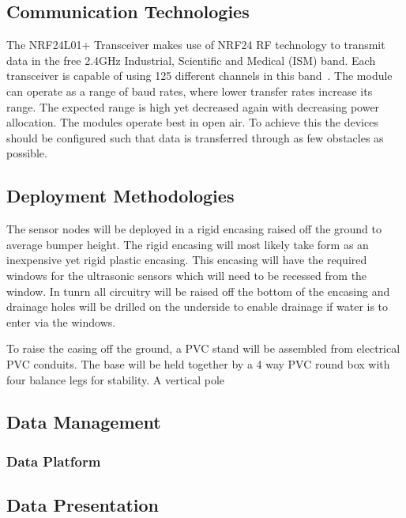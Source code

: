 \documentclass[10pt,twocolumn]{witseiepaper}
\begin{document}
	\subsection{Communication Technologies}
		The NRF24L01+ Transceiver makes use of NRF24 RF technology to transmit data in the free 2.4GHz Industrial,
		Scientific and Medical (ISM) band.  Each transceiver is capable of using 125 different channels in this band~\cite{howToMech_NRF24L01Tutorial}. The module can operate as a range of baud rates, where lower transfer rates increase its range. The expected range is high yet decreased again with decreasing power allocation. The modules operate best in open air. To achieve this the devices should be configured such that data is transferred through as few obstacles as possible. 
		
	
	\subsection{Deployment Methodologies}
		The sensor nodes will be deployed in a rigid encasing raised off the ground to average bumper height. The rigid encasing will most likely take form as an inexpensive yet rigid plastic encasing. This encasing will have the required windows for the ultrasonic sensors which will need to be recessed from the window. In tunrn all circuitry will be raised off the bottom of the encasing and drainage holes will be drilled on the underside to enable drainage if water is to enter via the windows.
		
		To raise the casing off the ground, a PVC stand will be assembled from electrical PVC conduits. The base will be held together by a 4 way PVC round box with four balance legs for stability. A vertical pole 
	
	\subsection{Data Management}

	\subsubsection{Data Platform}

	\subsection{Data Presentation}
	
\end{document}
